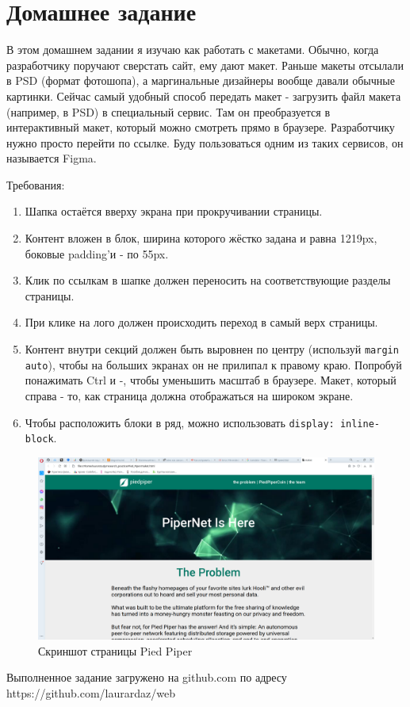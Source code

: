 \documentclass[14pt]{extreport}
\begin{document}
\section{Домашнее задание}

В этом домашнем задании я изучаю как работать с макетами. Обычно, когда разработчику поручают сверстать сайт, ему дают макет. Раньше макеты отсылали в PSD (формат фотошопа), а маргинальные дизайнеры вообще давали обычные картинки. Сейчас самый удобный способ передать макет - загрузить файл макета (например, в PSD) в специальный сервис. Там он преобразуется в интерактивный макет, который можно смотреть прямо в браузере. Разработчику нужно просто перейти по ссылке.  Буду пользоваться одним из таких сервисов, он называется Figma.

Требования:
\begin{enumerate}
\item Шапка остаётся вверху экрана при прокручивании страницы.
\item Контент вложен в блок, ширина которого жёстко задана и равна 1219px, боковые padding'и - по 55px.
\item Клик по ссылкам в шапке должен переносить на соответствующие разделы страницы.
\item При клике на лого должен происходить переход в самый верх страницы.
\item Контент внутри секций должен быть выровнен по центру (используй \texttt{margin auto}), чтобы на больших экранах он не прилипал к правому краю. Попробуй понажимать Ctrl и  -, чтобы уменьшить масштаб в браузере. Макет, который справа - то, как страница должна отображаться на широком экране.
\item Чтобы расположить блоки в ряд, можно использовать \texttt{display: inline-block}.
\end{enumerate}
\begin{figure}[H]
\centerline{\includegraphics[width=0.8\linewidth]{pics_practice/piedpiper.png}}
\caption{Скриншот страницы Pied Piper}
\label{9}
\end{figure}
Выполненное задание загружено на github.com по адресу https://github.com/laurardaz/web
\end{document}

